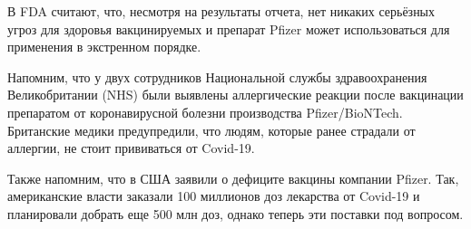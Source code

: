 В FDA считают, что, несмотря на результаты отчета, нет никаких серьёзных угроз
для здоровья вакцинируемых и препарат Pfizer может использоваться для
применения в экстренном порядке.

Напомним, что у двух сотрудников Национальной службы здравоохранения
Великобритании (NHS) были выявлены аллергические реакции после вакцинации
препаратом от коронавирусной болезни производства Pfizer/BioNTech. Британские
медики предупредили, что людям, которые ранее страдали от аллергии, не стоит
прививаться от Covid-19.

Также напомним, что в США заявили о дефиците вакцины компании Pfizer. Так,
американские власти заказали 100 миллионов доз лекарства от Covid-19 и
планировали добрать еще 500 млн доз, однако теперь эти поставки под вопросом.
